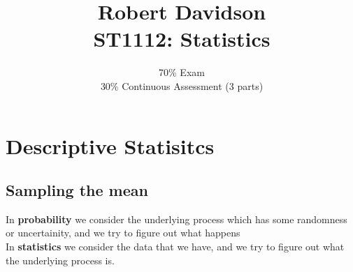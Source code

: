 \documentclass[a4paper, 10pt]{article}
\title{
Robert Davidson \\
\textbf{ST1112: Statistics}
}
\author{
70\% Exam\\
30\% Continuous Assessment (3 parts)
}
\date{}       %
\begin{document}
\maketitle
\pagebreak



\tableofcontents
\pagebreak
\section{Descriptive Statisitcs}
\subsection{Sampling the mean}
In \textbf{probability} we consider the underlying process which has some randomness or uncertainity, and we try to figure out what happens \\[2ex]
In \textbf{statistics} we consider the data that we have, and we try to figure out what the underlying process is.
\end{document}
